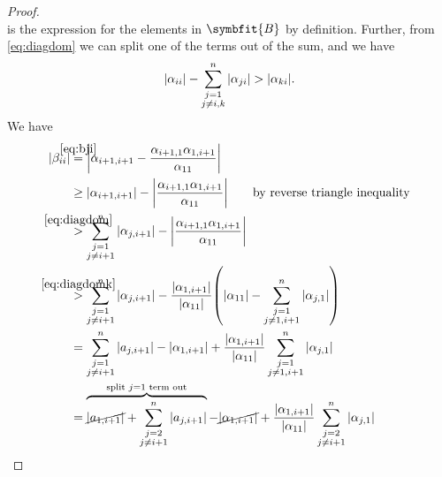 \documentclass{article}
\theoremstyle{definition}
\newcommand{\mat}[1]{\symbfit{#1}}
\begin{document}
\begin{enumerate}[leftmargin=\labelsep]
\begin{proof}
\begin{equation}
		      \end{equation}
		      is the expression for the elements in \(\mat{B}\) by definition. Further, from \cref{eq:diagdom} we can split one of the terms out of the sum, and we have
		      \begin{equation}
			      \abs{\alpha_{ii}} - \sum_{\substack{j=1\\j\neq i,k}}^n \abs{\alpha_{ji}} > \abs{\alpha_{ki}}. \label{eq:diagdomk}
		      \end{equation}
		      We have
			      {
				      \allowdisplaybreaks
				      \begin{align*}
					      \abs{\beta_{ii}} & \stackrel{\mathclap{\eqref{eq:bji}}}{=} \abs{\alpha_{i+1,i+1} - \frac{\alpha_{i+1,1}\alpha_{1,i+1}}{\alpha_{11}}}                                                                                                                                                   \\
					                       & \geq \abs{\alpha_{i+1,i+1}} - \abs{\frac{\alpha_{i+1,1}\alpha_{1,i+1}}{\alpha_{11}}} \qquad\text{by reverse triangle inequality}                                                                                                                                    \\
					                       & \stackrel{\mathclap{\eqref{eq:diagdom}}}{>} \sum_{\substack{j=1\\j\neq i+1}}^n \abs{\alpha_{j,i+1}} - \abs{\frac{\alpha_{i+1,1}\alpha_{1,i+1}}{\alpha_{11}}}                                                                                                        \\
					                       & \stackrel{\mathclap{\eqref{eq:diagdomk}}}{>} \sum_{\substack{j=1\\j\neq i+1}}^n \abs{\alpha_{j,i+1}} - \frac{\abs{\alpha_{1,i+1}}}{\abs{\alpha_{11}}}\qty( \abs{\alpha_{11}} - \sum_{\substack{j=1\\j\neq 1,i+1}}^n \abs{\alpha_{j,1}})                             \\
					                       & = \sum_{\substack{j=1\\j\neq i+1}}^n \abs{a_{j,i+1}} - \abs{\alpha_{1,i+1}} + \frac{\abs{\alpha_{1,i+1}}}{\abs{\alpha_{11}}} \sum_{\substack{j=1\\j\neq 1,i+1}}^n \abs{\alpha_{j,1}}                                                                                \\
					                       & = \overbrace{\cancel{\abs{a_{1,i+1}}}+\sum_{\substack{j=2\\j\neq i+1}}^n \abs{a_{j,i+1}}}^{\text{split }j=1\text{ term out}} - \cancel{\abs{\alpha_{1,i+1}}} + \frac{\abs{\alpha_{1,i+1}}}{\abs{\alpha_{11}}} \sum_{\substack{j=2\\j\neq i+1}}^n \abs{\alpha_{j,1}} \\

\end{align*}}
\end{proof}
\end{enumerate}
\end{document}
